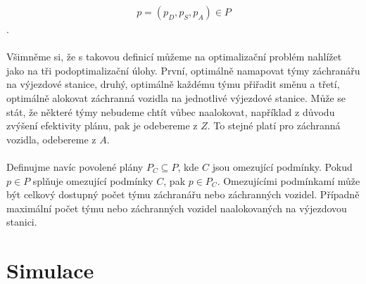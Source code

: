 \begin{align}
p = (p_D, p_S, p_A) \in P
\end{align}
.
\\
\\
Všimněme si, že s takovou definicí můžeme na optimalizační problém nahlížet jako na tři podoptimalizační úlohy.
První, optimálně namapovat týmy záchranářu na výjezdové stanice, druhý, optimálně každému týmu přiřadit směnu a třetí, optimálně alokovat záchranná vozidla na jednotlivé výjezdové stanice.
Může se stát, že některé týmy nebudeme chtít vůbec naalokovat, například z důvodu zvýšení efektivity plánu, pak je odebereme z $Z$. To stejné platí pro záchranná vozidla, odebereme z $A$.
\\
\\
Definujme navíc povolené plány $P_C \subseteq P$, kde $C$ jsou omezující podmínky. Pokud $p \in P$ splňuje omezující podmínky $C$, pak $p \in P_C$. 
Omezujícími podmínkamí může být celkový dostupný počet týmu záchranářu nebo záchranných vozidel. Případně maximální počet týmu nebo záchranných vozidel naalokovaných na výjezdovou stanici.

\clearpage

\section{Simulace}

